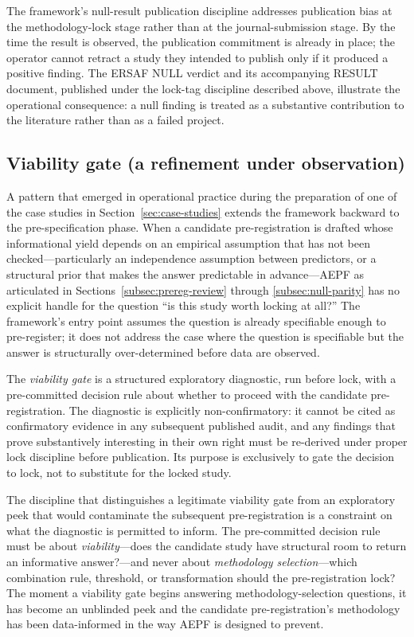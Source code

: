 \documentclass[11pt]{article}
\begin{document}
The framework's null-result publication discipline addresses
publication bias \cite{ioannidis2005} at the methodology-lock stage
rather than at the journal-submission stage. By the time the result
is observed, the publication commitment is already in place; the
operator cannot retract a study they intended to publish only if it
produced a positive finding. The ERSAF NULL verdict and its
accompanying RESULT document, published under the lock-tag
discipline described above, illustrate the operational consequence:
a null finding is treated as a substantive contribution to the
literature rather than as a failed project.

\subsection{Viability gate (a refinement under observation)}
\label{subsec:viability-gate}

A pattern that emerged in operational practice during the
preparation of one of the case studies in
Section~\ref{sec:case-studies} extends the framework backward to
the pre-specification phase. When a candidate pre-registration is
drafted whose informational yield depends on an empirical
assumption that has not been checked---particularly an
independence assumption between predictors, or a structural prior
that makes the answer predictable in advance---AEPF as articulated
in Sections~\ref{subsec:prereg-review} through
\ref{subsec:null-parity} has no explicit handle for the question
``is this study worth locking at all?'' The framework's entry
point assumes the question is already specifiable enough to
pre-register; it does not address the case where the question is
specifiable but the answer is structurally over-determined before
data are observed.

The \emph{viability gate} is a structured exploratory diagnostic,
run before lock, with a pre-committed decision rule about whether
to proceed with the candidate pre-registration. The diagnostic is
explicitly non-confirmatory: it cannot be cited as confirmatory
evidence in any subsequent published audit, and any findings that
prove substantively interesting in their own right must be
re-derived under proper lock discipline before publication. Its
purpose is exclusively to gate the decision to lock, not to
substitute for the locked study.

The discipline that distinguishes a legitimate viability gate from
an exploratory peek that would contaminate the subsequent
pre-registration is a constraint on what the diagnostic is
permitted to inform. The pre-committed decision rule must be about
\emph{viability}---does the candidate study have structural room
to return an informative answer?---and never about
\emph{methodology selection}---which combination rule, threshold,
or transformation should the pre-registration lock? The moment a
viability gate begins answering methodology-selection questions,
it has become an unblinded peek and the candidate
pre-registration's methodology has been data-informed in the way
AEPF is designed to prevent.
\end{document}
